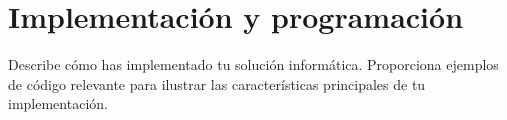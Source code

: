 \section{Implementación y programación}

Describe cómo has implementado tu solución informática.
Proporciona ejemplos de código relevante para ilustrar las características principales de tu implementación.